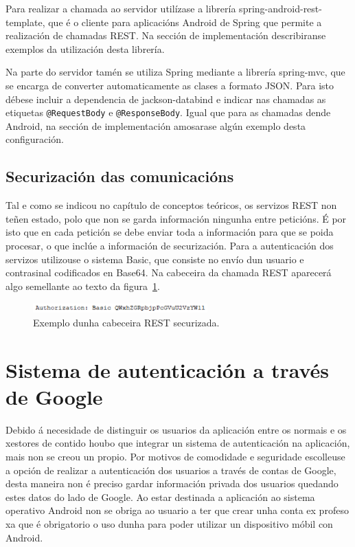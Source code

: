 Para realizar a chamada ao servidor utilízase a librería spring-android-rest-template, que é o cliente para aplicacións Android de Spring \cite{springAndroid} que permite a realización de chamadas REST. Na sección de implementación describiranse exemplos da utilización desta librería.

Na parte do servidor tamén se utiliza Spring \cite{spring} mediante a librería spring-mvc, que se encarga de converter automaticamente as clases a formato JSON. Para isto débese incluir a dependencia de jackson-databind e indicar nas chamadas as etiquetas \lstinline{@RequestBody} e \lstinline{@ResponseBody}. Igual que para as chamadas dende Android, na sección de implementación amosarase algún exemplo desta configuración.

\subsection{Securización das comunicacións}
Tal e como se indicou no capítulo de conceptos teóricos, os servizos REST non teñen estado, polo que non se garda información ningunha entre peticións. É por isto que en cada petición se debe enviar toda a información para que se poida procesar, o que inclúe a información de securización.
Para a autenticación dos servizos utilizouse o sistema Basic, que consiste no envío dun usuario e contrasinal codificados en Base64. Na cabeceira da chamada REST aparecerá algo semellante ao texto da figura~\ref{fig:authorization}.

\begin{figure}[!h]
	\begin{center}
		\includegraphics[width=0.6\textwidth]{figures/codigo/authorization}
		\caption{Exemplo dunha cabeceira REST securizada.}
		\label{fig:authorization}
	\end{center}
\end{figure}


\section{Sistema de autenticación a través de Google}
Debido á necesidade de distinguir os usuarios da aplicación entre os normais e os xestores de contido houbo que integrar un sistema de autenticación na aplicación, mais non se creou un propio.
Por motivos de comodidade e seguridade escolleuse a opción de realizar a autenticación dos usuarios a través de contas de Google, desta maneira non é preciso gardar información privada dos usuarios quedando estes datos do lado de Google. Ao estar destinada a aplicación ao sistema operativo Android non se obriga ao usuario a ter que crear unha conta ex profeso xa que é obrigatorio o uso dunha para poder utilizar un dispositivo móbil con Android.


